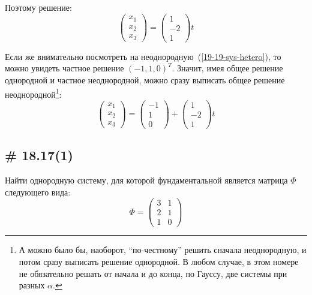 \documentclass[a4paper,12pt]{article}
\begin{document}
\begin{solution}
    Поэтому решение:
    \[
      \begin{pmatrix}
        x_1\\
        x_2\\
        x_3
      \end{pmatrix} = \begin{pmatrix}
        1\\
        -2\\
        1
      \end{pmatrix} t
    \]

    Если же внимательно посмотреть на неоднородную~(\ref{19-19-sys-hetero}), то можно увидеть частное решение $(-1, 1, 0)^T$.
    Значит, имея общее решение однородной и частное неоднородной, можно сразу выписать общее решение неоднородной\footnote{А можно было бы, наоборот, ``по-честному'' решить сначала неоднородную, и потом сразу выписать решение однородной. В любом случае, в этом номере не обязательно решать от начала и до конца, по Гауссу, две системы при разных $\alpha$.}:
    \[
      \begin{pmatrix}
        x_1\\
        x_2\\
        x_3
      \end{pmatrix} = \begin{pmatrix}
        -1\\
        1\\
        0
      \end{pmatrix} + \begin{pmatrix}
        1\\
        -2\\
        1
      \end{pmatrix} t
    \]
  \end{solution}

  
  \subsection{\# 18.17(1)}
  
  Найти однородную систему, для которой фундаментальной является матрица $\Phi$ следующего вида:
  \[
    \Phi = \begin{pmatrix}
      3 & 1\\
      2 & 1\\
      1 & 0
    \end{pmatrix}
  \]
  
\end{document}
